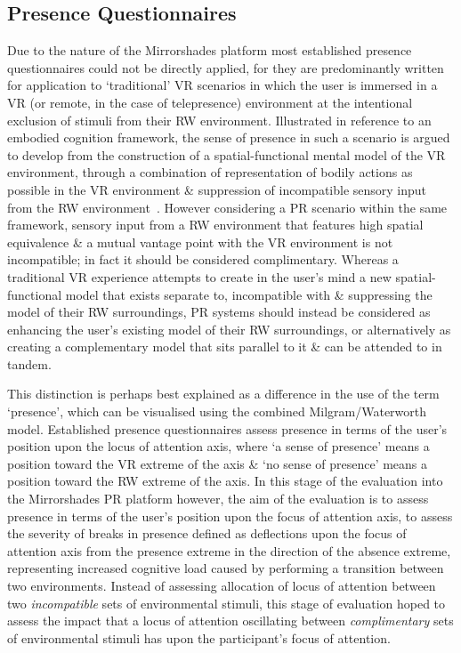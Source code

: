\subsection{Presence Questionnaires}

Due to the nature of the Mirrorshades platform most established presence questionnaires could not be directly applied,  for they are predominantly written for application to `traditional' VR scenarios in which the user is immersed in a VR (or remote, in the case of telepresence) environment at the intentional exclusion of stimuli from their RW environment. Illustrated in reference to an embodied cognition framework, the sense of presence in such a scenario is argued to develop from the construction of a spatial-functional mental model of the VR environment, through a combination of representation of bodily actions as possible in the VR environment \& suppression of incompatible sensory input from the RW environment~\cite{Schubert2001}. However considering a PR scenario within the same framework, sensory input from a RW environment that features high spatial equivalence \& a mutual vantage point with the VR environment is not incompatible; in fact it should be considered complimentary. Whereas a traditional VR experience attempts to create in the user's mind a new spatial-functional model that exists separate to, incompatible with \& suppressing the model of their RW surroundings, PR systems should instead be considered as enhancing the user's existing model of their RW surroundings, or alternatively as creating a complementary model that sits parallel to it \& can be attended to in tandem.

This distinction is perhaps best explained as a difference in the use of the term `presence', which can be visualised using the combined Milgram/Waterworth model. Established presence questionnaires assess presence in terms of the user's position upon the locus of attention axis, where `a sense of presence' means a position toward the VR extreme of the axis \& `no sense of presence' means a position toward the RW extreme of the axis. In this stage of the evaluation into the Mirrorshades PR platform however, the aim of the evaluation is to assess presence in terms of the user's position upon the focus of attention axis, to assess the severity of breaks in presence defined as deflections upon the focus of attention axis from the presence extreme in the direction of the absence extreme, representing increased cognitive load caused by performing a transition between two environments. Instead of assessing allocation of locus of attention between two \textit{incompatible} sets of environmental stimuli, this stage of evaluation hoped to assess the impact that a locus of attention oscillating between \textit{complimentary} sets of environmental stimuli has upon the participant's focus of attention.

